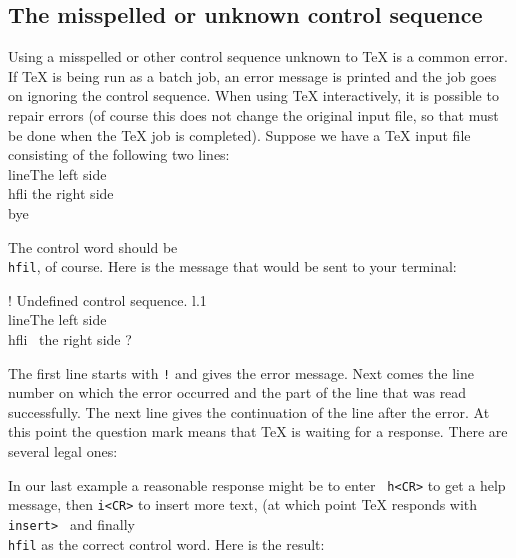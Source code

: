 \subsection{The misspelled or unknown control sequence} 

Using a misspelled or other control sequence unknown to \TeX{} is 
a common error.  If \TeX{} is being run as a batch job, an error 
message is printed and the job goes on ignoring the control 
sequence.  When using \TeX{} interactively, it is possible to 
repair errors (of course this does not change the original input 
file, so that must be done when the \TeX{} job is completed). 
Suppose we have a \TeX{} input file consisting of the following 
two lines: 
\beginuser 
\\line\lb The left side \\hfli the right side\rb 
\\bye 
\enduser 

The control word should be {\tt \\hfil}, of course. Here is the 
message that would be sent to your terminal: 

\beginuser 
\obeyspaces 
! Undefined  control sequence. 
l.1 \\line\lb The left side \\hfli 
\                               the right side\rb 
? 
\enduser 

The first line starts with {\tt !} and gives the error message. 
Next comes the line number on which the error occurred and the 
part of the line that was read successfully.  The next line gives 
the continuation of the line after the error. At this point the 
question mark means that \TeX{} is waiting for a response.  There 
are several legal ones: 
\nobreak 
{} 

In our last example a reasonable response might be to enter {\tt 
h<CR>} to get a help message, then {\tt i<CR>} to insert more 
text, (at which point \TeX{} responds with {\tt insert> } and 
finally {\tt \\hfil} as the correct control word.  Here is the 
result: 


